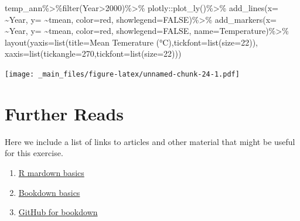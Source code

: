 \documentclass[
]{book}
\newenvironment{Shaded}{\begin{snugshade}}{\end{snugshade}}
\newcommand{\AttributeTok}[1]{\textcolor[rgb]{0.77,0.63,0.00}{#1}}
\newcommand{\ConstantTok}[1]{\textcolor[rgb]{0.00,0.00,0.00}{#1}}
\newcommand{\DecValTok}[1]{\textcolor[rgb]{0.00,0.00,0.81}{#1}}
\newcommand{\FunctionTok}[1]{\textcolor[rgb]{0.00,0.00,0.00}{#1}}
\newcommand{\NormalTok}[1]{#1}
\newcommand{\SpecialCharTok}[1]{\textcolor[rgb]{0.00,0.00,0.00}{#1}}
\newcommand{\StringTok}[1]{\textcolor[rgb]{0.31,0.60,0.02}{#1}}
\providecommand{\tightlist}{%
  \setlength{\itemsep}{0pt}\setlength{\parskip}{0pt}}
\begin{document}
\begin{Shaded}
\begin{Highlighting}[]
\NormalTok{temp\_ann}\SpecialCharTok{\%\textgreater{}\%}\FunctionTok{filter}\NormalTok{(Year}\SpecialCharTok{\textgreater{}}\DecValTok{2000}\NormalTok{)}\SpecialCharTok{\%\textgreater{}\%}\NormalTok{ plotly}\SpecialCharTok{::}\FunctionTok{plot\_ly}\NormalTok{()}\SpecialCharTok{\%\textgreater{}\%}
 \FunctionTok{add\_lines}\NormalTok{(}\AttributeTok{x=} \SpecialCharTok{\textasciitilde{}}\NormalTok{Year, }\AttributeTok{y=} \SpecialCharTok{\textasciitilde{}}\NormalTok{tmean, }\AttributeTok{color=}\StringTok{\textquotesingle{}red\textquotesingle{}}\NormalTok{, }\AttributeTok{showlegend=}\ConstantTok{FALSE}\NormalTok{)}\SpecialCharTok{\%\textgreater{}\%}
  \FunctionTok{add\_markers}\NormalTok{(}\AttributeTok{x=} \SpecialCharTok{\textasciitilde{}}\NormalTok{Year, }\AttributeTok{y=} \SpecialCharTok{\textasciitilde{}}\NormalTok{tmean, }\AttributeTok{color=}\StringTok{\textquotesingle{}red\textquotesingle{}}\NormalTok{, }\AttributeTok{showlegend=}\ConstantTok{FALSE}\NormalTok{, }
              \AttributeTok{name=}\StringTok{\textquotesingle{}Temperature\textquotesingle{}}\NormalTok{)}\SpecialCharTok{\%\textgreater{}\%}
  \FunctionTok{layout}\NormalTok{(}\AttributeTok{yaxis=}\FunctionTok{list}\NormalTok{(}\AttributeTok{title=}\StringTok{\textquotesingle{}Mean Temerature (°C)\textquotesingle{}}\NormalTok{,}\AttributeTok{tickfont=}\FunctionTok{list}\NormalTok{(}\AttributeTok{size=}\DecValTok{22}\NormalTok{)),}
         \AttributeTok{xaxis=}\FunctionTok{list}\NormalTok{(}\AttributeTok{tickangle=}\DecValTok{270}\NormalTok{,}\AttributeTok{tickfont=}\FunctionTok{list}\NormalTok{(}\AttributeTok{size=}\DecValTok{22}\NormalTok{)))}
\end{Highlighting}
\end{Shaded}

\texttt{[image: \_main\_files/figure-latex/unnamed-chunk-24-1.pdf]}

\hypertarget{further-reads}{%
\chapter{Further Reads}\label{further-reads}}

Here we include a list of links to articles and other material that might be useful for this exercise.

\begin{enumerate}
\def\labelenumi{\arabic{enumi}.}
\tightlist
\item
  \href{https://bookdown.org/yihui/rmarkdown/}{R mardown basics}
\item
  \href{https://bookdown.org/yihui/bookdown/}{Bookdown basics}
\item
  \href{https://bookdown.org/yihui/bookdown/github.html}{GitHub for bookdown}
\end{enumerate}

  
\end{document}
